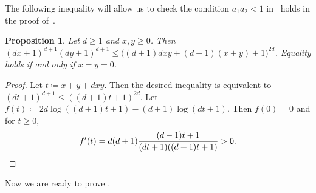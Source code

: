 \documentclass{article}
\numberwithin{equation}{section}
\theoremstyle{plain}
\newtheorem{proposition}[theorem]{Proposition}
\theoremstyle{definition}
\theoremstyle{remark} %
\newcommand{\defeq}{\coloneqq}
\begin{document}
The following inequality will allow us to check the condition $a_1a_2<1$ in~ holds in the proof of~.

\begin{proposition}\label{prop:basic-ineq}
	Let \(d\ge1\) and \(x,y\ge0\). Then
	\(
		(dx+1)^{d+1} (dy+1)^{d+1} \le \bigl( (d+1)dxy + (d+1)(x+y) + 1 \bigr)^{2d}
	\).
	Equality holds if and only if \(x=y=0\).
\end{proposition}
\begin{proof}
    Let \(t\defeq x+y+dxy\). Then the desired inequality is equivalent to \((dt+1)^{d+1} \le ((d+1)t+1)^{2d}\).
    Let \(f(t) \defeq 2d\log((d+1)t+1) - (d+1) \log(dt+1)\).
    Then \(f(0) = 0\) and for \(t\ge0\),
    \[
        f'(t) = d(d+1) \frac{(d-1)t+1}{(dt+1)((d+1)t+1)} > 0. \qedhere
    \]
\end{proof}


Now we are ready to prove .
\end{document}
